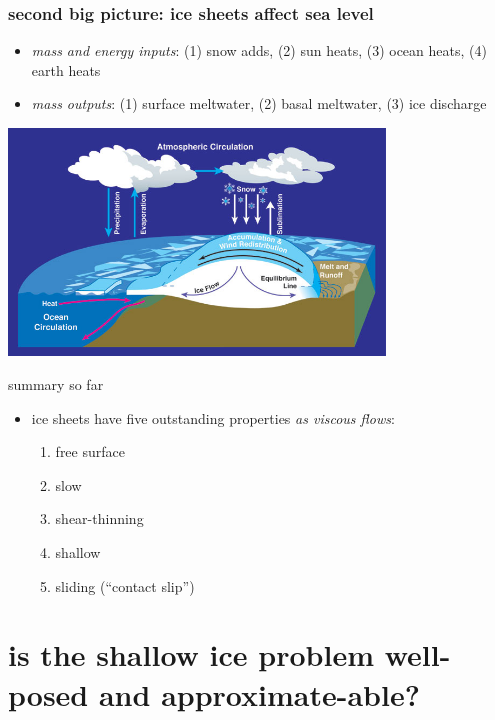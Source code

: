 \documentclass[hide notes,intlimits]{beamer}
\begin{document}
\begin{frame}
  \frametitle{second big picture: ice sheets affect sea level}
\medskip
\small
\begin{itemize}
\item \emph{mass and energy inputs}: (1) snow adds, (2) sun heats, (3) ocean heats, (4) earth heats
\item \emph{mass outputs}: (1) surface meltwater, (2) basal meltwater, (3) ice discharge
\end{itemize}
\begin{center}
  \includegraphics[width=0.75\textwidth]{mass-bal-atmos}
\end{center}
\end{frame}


\begin{frame}{summary so far}
\begin{itemize}
\item ice sheets have five outstanding properties \emph{as viscous flows}:
  \begin{enumerate}
  \item \alert{free surface}
  \item \alert{slow}
  \item \alert{shear-thinning}
  \item \alert{shallow}
  \item \alert{sliding (``contact slip'')}
  \end{enumerate}
\end{itemize}
\end{frame}


\section[shallow ice well-posed?]{is the shallow ice problem well-posed and approximate-able?}
\end{document}
